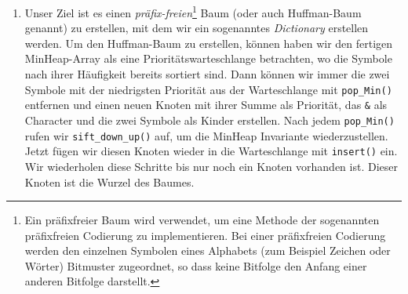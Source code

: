 \documentclass[course=erap]{aspdoc}
\begin{document}
\begin{enumerate}
\item Unser Ziel ist es einen \emph{präfix-freien}\footnote{Ein präfixfreier Baum wird verwendet, um eine Methode der sogenannten präfixfreien Codierung zu implementieren. Bei einer präfixfreien Codierung werden den einzelnen Symbolen eines Alphabets (zum Beispiel Zeichen oder Wörter) Bitmuster zugeordnet, so dass keine Bitfolge den Anfang einer anderen Bitfolge darstellt.} Baum (oder auch Huffman-Baum genannt) zu erstellen, mit dem wir ein sogenanntes \emph{Dictionary} erstellen werden.
Um den Huffman-Baum zu erstellen, können haben wir den fertigen MinHeap-Array als eine Prioritätswarteschlange betrachten, wo die Symbole nach ihrer Häufigkeit bereits sortiert sind. Dann können wir immer die zwei Symbole mit der niedrigsten Priorität aus der Warteschlange mit \verb+pop_Min()+ entfernen und einen neuen Knoten mit ihrer Summe als Priorität, das \verb+&+ als Character und die zwei Symbole als Kinder erstellen. Nach jedem \verb+pop_Min()+ rufen wir \verb+sift_down_up()+ auf, um die MinHeap Invariante wiederzustellen.
Jetzt fügen wir diesen Knoten wieder in die Warteschlange mit \verb+insert()+ ein. Wir wiederholen diese Schritte bis nur noch ein Knoten vorhanden ist. Dieser Knoten ist die Wurzel des Baumes.



\end{enumerate}
\end{document}
